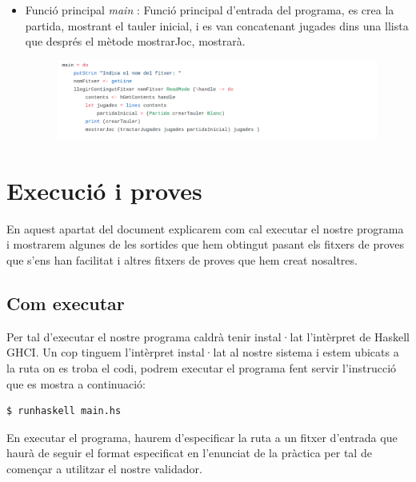 \documentclass[12pt]{article}
\begin{document}
\begin{itemize}
\item Funció principal \textit{main} : Funció principal d'entrada del programa, es crea la partida, mostrant el tauler inicial, i es van concatenant jugades dins una llista que després el mètode mostrarJoc, mostrarà.

\begin{figure}[htb]
\begin{center}
\includegraphics[width=18cm]{main}
\end{center}
\end{figure}

\end{itemize}

\newpage

\section{Execució i proves}
En aquest apartat del document explicarem com cal executar el nostre programa i mostrarem algunes de les sortides que hem obtingut pasant els fitxers de proves que s'ens han facilitat i altres fitxers de proves que hem creat nosaltres.

\subsection{Com executar}
Per tal d'executar el nostre programa caldrà tenir instal·lat l'intèrpret de Haskell GHCI. Un cop tinguem l'intèrpret instal·lat al nostre sistema i estem ubicats a la ruta on es troba el codi, podrem executar el programa fent servir l'instrucció que es mostra a continuació:

\begin{center}
\begin{lstlisting}[language=bash]
  $ runhaskell main.hs
\end{lstlisting}
\end{center}
\noindent
En executar el programa, haurem d'especificar la ruta a un fitxer d'entrada que haurà de seguir el format especificat en l'enunciat de la pràctica per tal de començar a utilitzar el nostre validador.
\end{document}
